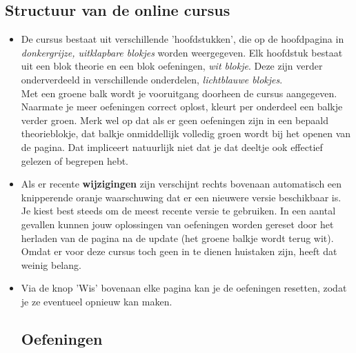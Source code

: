 \documentclass{ximera}
\begin{document}
 
 
\begin{onlineOnly}
\section*{Structuur van de online cursus}
 
\begin{itemize}
    \item De cursus bestaat uit verschillende 'hoofdstukken', die op de hoofdpagina in \textit{donkergrijze, uitklapbare blokjes} worden weergegeven. Elk hoofdstuk bestaat uit een blok theorie en een blok oefeningen, \textit{wit blokje}. Deze zijn verder onderverdeeld in verschillende onderdelen, \textit{lichtblauwe blokjes}.
    \\
    Met een groene balk wordt je vooruitgang doorheen de cursus aangegeven. Naarmate je meer oefeningen correct oplost, kleurt per onderdeel een balkje verder groen.
    Merk wel op dat als er geen oefeningen zijn in een bepaald theorieblokje, dat balkje onmiddellijk volledig groen wordt bij het openen van de pagina. Dat impliceert natuurlijk niet dat je dat deeltje ook effectief gelezen of begrepen hebt.
     
    \item Als er recente \textbf{wijzigingen} zijn verschijnt rechts bovenaan automatisch een knipperende oranje waarschuwing dat er een nieuwere versie beschikbaar is. Je kiest best steeds om de meest recente versie te gebruiken. In een aantal gevallen kunnen jouw oplossingen van oefeningen worden gereset door het herladen van de pagina na de update (het groene balkje wordt terug wit). Omdat er voor deze cursus toch geen in te dienen huistaken zijn, heeft dat weinig belang.
     
    \item Via de knop 'Wis' bovenaan elke pagina kan je de oefeningen resetten, zodat je ze eventueel opnieuw kan maken.
     
 
\section*{Oefeningen}

\end{itemize}
\end{onlineOnly}
\end{document}
